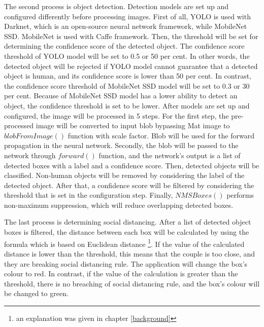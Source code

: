         The second process is object detection.
        Detection models are set up and configured differently before processing images.
        First of all, YOLO is used with Darknet, which is an open-source neural network framework,
            while MobileNet SSD. MobileNet is used with Caffe framework.
        Then, the threshold will be set for determining the confidence score of the detected object.
            The confidence score threshold of YOLO model will be set to 0.5 or 50 per cent.
            In other words, the detected object will be rejected if YOLO model cannot guarantee that a detected object is human,
            and its confidence score is lower than 50 per cent.
            In contrast, the confidence score threshold of MobileNet SSD model will be set to 0.3 or 30 per cent.
            Because of MobileNet SSD model has a lower ability to detect an object, the confidence threshold is set to be lower.
        After models are set up and configured, the image will be processed in 5 steps.
        For the first step, the pre-processed image will be converted to input blob bypassing Mat image to $blobFromImage()$ function with scale factor.
            Blob will be used for the forward propagation in the neural network.
        Secondly, the blob will be passed to the network through $forward()$ function,
            and the network's output is a list of detected boxes with a label and a confidence score.
        Then, detected objects will be classified.
            Non-human objects will be removed by considering the label of the detected object.
        After that, a confidence score will be filtered by considering the threshold that is set in the configuration step.
        Finally, $NMSBoxes()$ performs non-maximum suppression, which will reduce overlapping detected boxes.

        The last process is determining social distancing.
        After a list of detected object boxes is filtered,
        the distance between each box will be calculated by using the formula which is based on Euclidean distance
        \footnote{an explanation was given in chapter \ref{background}}.
        If the value of the calculated distance is lower than the threshold,
        this means that the couple is too close, and they are breaking social distancing rule.
        The application will change the box's colour to red.
        In contrast, if the value of the calculation is greater than the threshold,
        there is no breaching of social distancing rule, and the box's colour will be changed to green.

